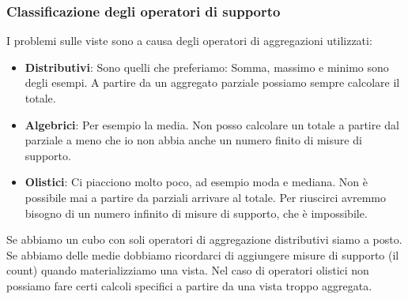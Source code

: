 \subsubsection{Classificazione degli operatori di supporto}
I problemi sulle viste sono a causa degli operatori di aggregazioni utilizzati:
\begin{itemize}
	\item \textbf{Distributivi}: Sono quelli che preferiamo: Somma, massimo e minimo sono degli esempi. A partire da un aggregato parziale possiamo sempre calcolare il totale.
	\item \textbf{Algebrici}: Per esempio la media. Non posso calcolare un totale a partire dal parziale a meno che io non abbia anche un numero finito di misure di supporto.
	\item \textbf{Olistici}: Ci piacciono molto poco, ad esempio moda e mediana. Non è possibile mai a partire da parziali arrivare al totale. Per riuscirci avremmo bisogno di un numero infinito di misure di supporto, che è impossibile.
\end{itemize}
\begin{info}[Morale:]
	Se abbiamo un cubo con soli operatori di aggregazione distributivi siamo a posto. Se abbiamo delle medie dobbiamo ricordarci di aggiungere misure di supporto (il count) quando materializziamo una vista. Nel caso di operatori olistici non possiamo fare certi calcoli specifici a partire da una vista troppo aggregata.
\end{info}

